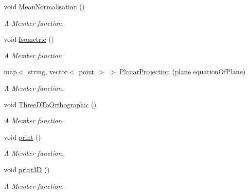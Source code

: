 \begin{DoxyCompactItemize}
void \hyperlink{classThreeDGraph__class_ad30f5f058cfe9a0de8a91dd062fb10c5}{Mean\+Normalisation} ()
\begin{DoxyCompactList}\small\item\em A Member function. \end{DoxyCompactList}\item 
void \hyperlink{classThreeDGraph__class_aec760645bb97742c87a50fe66aa68efe}{Isometric} ()
\begin{DoxyCompactList}\small\item\em A Member function. \end{DoxyCompactList}\item 
map$<$ string, vector$<$ \hyperlink{structpoint}{point} $>$ $>$ \hyperlink{classThreeDGraph__class_a9c802d66d5c79dd867f3566348d49921}{Planar\+Projection} (\hyperlink{structplane}{plane} equation\+Of\+Plane)
\begin{DoxyCompactList}\small\item\em A Member function. \end{DoxyCompactList}\item 
void \hyperlink{classThreeDGraph__class_ae69c2ee22498d903d1afa6b988edd1b6}{Three\+D\+To\+Orthographic} ()
\begin{DoxyCompactList}\small\item\em A Member function. \end{DoxyCompactList}\item 
void \hyperlink{classThreeDGraph__class_af53c26ef3f673e77e1213789fe14c8a2}{print} ()
\begin{DoxyCompactList}\small\item\em A Member function. \end{DoxyCompactList}\item 
void \hyperlink{classThreeDGraph__class_a08a1a3131c7090b8f783809f07810725}{print3D} ()
\begin{DoxyCompactList}\small\item\em A Member function. \end{DoxyCompactList}\end{DoxyCompactItemize}
